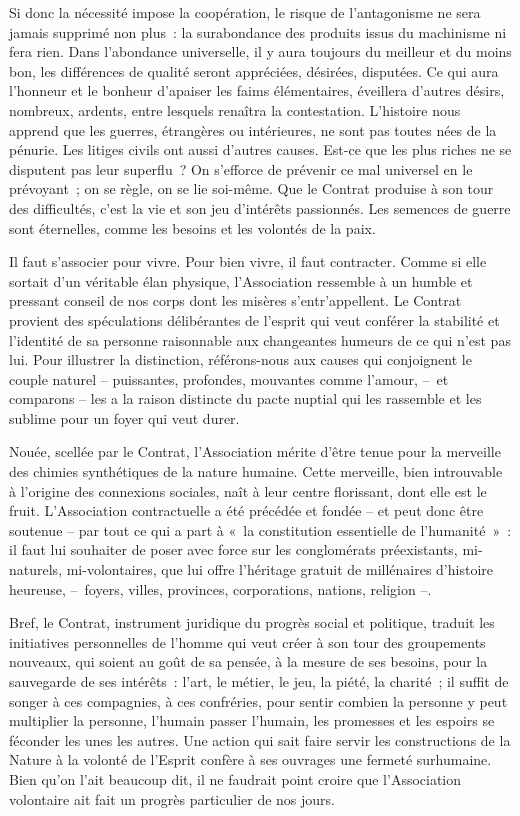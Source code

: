 \documentclass[french,twoside]{book} %
\begin{document}
Si donc la nécessité impose la coopération, le risque de l’antagonisme ne sera jamais supprimé non plus : la surabondance des produits issus du machinisme ni fera rien. Dans l’abondance universelle, il y aura toujours du meilleur et du moins bon, les différences de qualité seront appréciées, désirées, disputées. Ce qui aura l’honneur et le bonheur d’apaiser les faims élémentaires, éveillera d’autres désirs, nombreux, ardents, entre lesquels renaîtra la contestation. L’histoire nous apprend que les guerres, étrangères ou intérieures, ne sont pas toutes nées de la pénurie. Les litiges civils ont aussi d’autres causes. Est-ce que les plus riches ne se disputent pas leur superflu ? On s’efforce de prévenir ce mal universel en le prévoyant ; on se règle, on se lie soi-même. Que le Contrat produise à son tour des difficultés, c’est la vie et son jeu d’intérêts passionnés. Les semences de guerre sont éternelles, comme les besoins et les volontés de la paix.\par
Il faut s’associer pour vivre. Pour bien vivre, il faut contracter. Comme si elle sortait d’un véritable élan physique, l’Association ressemble à un humble et pressant conseil de nos corps dont les misères s’entr’appellent. Le Contrat provient des spéculations délibérantes de l’esprit qui veut conférer la stabilité et l’identité de sa personne raisonnable aux changeantes humeurs de ce qui n’est pas lui. Pour illustrer la distinction, référons-nous aux causes qui conjoignent le couple naturel – puissantes, profondes, mouvantes comme l’amour, – et comparons – les a la raison distincte du pacte nuptial qui les rassemble et les sublime pour un foyer qui veut durer.\par
Nouée, scellée par le Contrat, l’Association mérite d’être tenue pour la merveille des chimies synthétiques de la nature humaine. Cette merveille, bien introuvable à l’origine des connexions sociales, naît à leur centre florissant, dont elle est le fruit. L’Association contractuelle a été précédée et fondée – et peut donc être soutenue – par tout ce qui a part à « la constitution essentielle de l’humanité » : il faut lui souhaiter de poser avec force sur les conglomérats préexistants, mi-naturels, mi-volontaires, que lui offre l’héritage gratuit de millénaires d’histoire heureuse, – foyers, villes, provinces, corporations, nations, religion –.\par
Bref, le Contrat, instrument juridique du progrès social et politique, traduit les initiatives personnelles de l’homme qui veut créer à son tour des groupements nouveaux, qui soient au goût de sa pensée, à la mesure de ses besoins, pour la sauvegarde de ses intérêts : l’art, le métier, le jeu, la piété, la charité ; il suffit de songer à ces compagnies, à ces confréries, pour sentir combien la personne y peut multiplier la personne, l’humain passer l’humain, les promesses et les espoirs se féconder les unes les autres. Une action qui sait faire servir les constructions de la Nature à la volonté de l’Esprit confère à ses ouvrages une fermeté surhumaine. Bien qu’on l’ait beaucoup dit, il ne faudrait point croire que l’Association volontaire ait fait un progrès particulier de nos jours.\par
\end{document}
